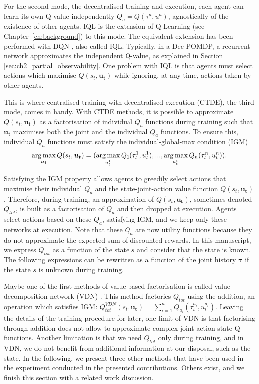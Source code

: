 For the second mode, the decentralised training and execution, each agent can learn its own Q-value independently $Q_a=Q(\tau^a, u^a)$, agnostically of the existence of other agents.
IQL \citep{Tan1993} is the extension of Q-Learning (see Chapter~\ref{ch:background}) to this mode. 
The equivalent extension has been performed with DQN \citep{TampuuDqnIQL}, also called IQL.
Typically, in a Dec-POMDP, a recurrent network approximates the independent Q-value, as explained in Section \ref{sec:ch2_partial_observability}.
One problem with IQL is that agents must select actions which maximise $Q(s_t, \mathbf{u_t})$ while ignoring, at any time, actions taken by other agents.

This is where centralised training with decentralised execution (CTDE), the third mode, comes in handy.
With CTDE methods, it is possible to approximate $Q(s_t, \mathbf{u_t})$ as a factorisation of individual $Q_a$ functions during training such that $\mathbf{u_t}$ maximises both the joint and the individual $Q_a$ functions.
To ensure this, individual $Q_a$ functions must satisfy the individual-global-max condition (IGM) \citep{Son2019QTRAN:Learning}
\begin{equation}
    \argmax_{\mathbf{u_t}} Q(s_t, \mathbf{u_t}) =(\argmax_{u_t^{1}} Q_{1}(\tau_t^{1}, u_t^{1}),...,\argmax_{u_t^{n}} Q_{n}(\tau_t^{n}, u_t^{n})).
    \label{eq:ch3_igm}
\end{equation}

Satisfying the IGM property allows agents to greedily select actions that maximise their individual $Q_a$ and the state-joint-action value function $Q(s_t, \mathbf{u_t})$.
Therefore, during training, an approximation of $Q(s_t, \mathbf{u_t})$, sometimes denoted $Q_{tot}$, is built as a factorisation of $Q_a$ and then dropped at execution.
Agents select actions based on these $Q_a$, satisfying IGM, and we keep only these networks at execution.
Note that these $Q_a$ are now utility functions because they do not approximate the expected sum of discounted rewards.
In this manuscript, we express $Q_{tot}$ as a function of the state $s$ and consider that the state is known.
The following expressions can be rewritten as a function of the joint history $\mathbf{\tau}$ if the state $s$ is unknown during training.

Maybe one of the first methods of value-based factorisation is called value decomposition network (VDN) \citep{sunehag2018vdn}.
This method factories $Q_{tot}$ using the addition, an operation which satisfies IGM: $Q_{tot}^{VDN}(s_t, \mathbf{u_t}) = \sum_{i=1}^n Q_{a_i}(\tau^{a_i}_t, u^{a_i}_t)$.
Leaving the details of the training procedure for later, one limit of VDN is that factorising through addition does not allow to approximate complex joint-action-state Q functions.
Another limitation is that we need $Q_{tot}$ only during training, and in VDN, we do not benefit from additional information at our disposal, such as the state.
In the following, we present three other methods that have been used in the experiment conducted in the presented contributions.
Others exist, and we finish this section with a related work discussion.

